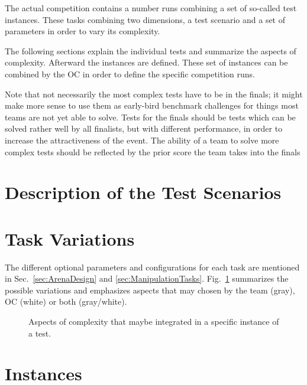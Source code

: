 
The actual competition contains a number runs combining a set of so-called
test instances. These tasks combining two dimensions, a test scenario and a
set of parameters in order to vary its complexity.

The following sections explain the individual tests and summarize the aspects of
complexity. Afterward the instances are defined. These set of instances can
be combined by the OC in order to define the specific competition runs.

Note that not necessarily the most complex tests have to be in the finals;
it might make more sense to use them as early-bird benchmark challenges for
things most teams are not yet able to solve. Tests for the finals should be
tests which can be solved rather well by all finalists, but with different
performance, in order to increase the attractiveness of the event. The ability
of a team to solve more complex tests should be reflected by the prior score
the team takes into the finals

\section{Description of the Test Scenarios}











\section{Task Variations}

The different optional parameters and configurations for each task are 
mentioned in Sec.~\ref{sec:ArenaDesign} and \ref{sec:ManipulationTasks}. 
Fig.~\ref{fig:complexityTree} summarizes the possible variations and 
emphasizes aspects that may chosen by the team (gray), OC (white) or both 
(gray/white).

\begin{figure}[ht]
\centering

\caption{Aspects of complexity that maybe integrated in a specific instance of a test.}
\label{fig:complexityTree}
\end{figure}


\section{Instances}

